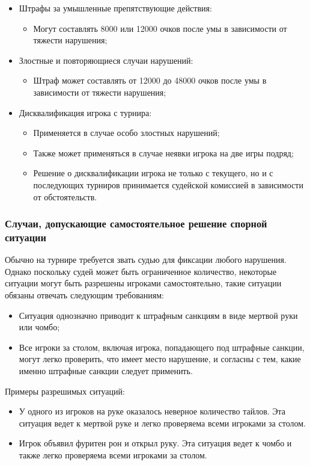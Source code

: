 \begin{itemize}
\begin{itemize}
	\end{itemize}
	\item Штрафы за умышленные препятствующие действия:
	\begin{itemize}
		\item Могут составлять 8000 или 12000 очков после умы в зависимости от тяжести нарушения;
	\end{itemize}
	\item Злостные и повторяющиеся случаи нарушений:
	\begin{itemize}
		\item Штраф может составлять от 12000 до 48000 очков после умы в зависимости от тяжести нарушения;
	\end{itemize}
	\item Дисквалификация игрока с турнира:
	\begin{itemize}
		\item Применяется в случае особо злостных нарушений;
		\item Также может применяться в случае неявки игрока на две игры подряд;
		\item Решение о дисквалификации игрока не только с текущего, но и с последующих турниров принимается судейской комиссией в зависимости от обстоятельств.
	\end{itemize}
\end{itemize}

\subsubsection{Случаи, допускающие самостоятельное решение спорной ситуации}

Обычно на турнире требуется звать судью для фиксации любого нарушения. Однако поскольку судей может быть ограниченное количество, некоторые ситуации могут быть разрешены игроками самостоятельно, такие ситуации обязаны отвечать следующим требованиям:
\begin{itemize}
	\item Ситуация однозначно приводит к штрафным санкциям в виде мертвой руки или чомбо;
	\item Все игроки за столом, включая игрока, попадающего под штрафные санкции, могут легко проверить, что имеет место нарушение, и согласны с тем, какие именно штрафные санкции следует применить.
\end{itemize}

Примеры разрешимых ситуаций:
\begin{itemize}
	\item У одного из игроков на руке оказалось неверное количество тайлов. Эта ситуация ведет к мертвой руке и легко проверяема всеми игроками за столом.
	\item Игрок объявил фуритен рон и открыл руку. Эта ситуация ведет к чомбо и также легко проверяема всеми игроками за столом.
\end{itemize}

